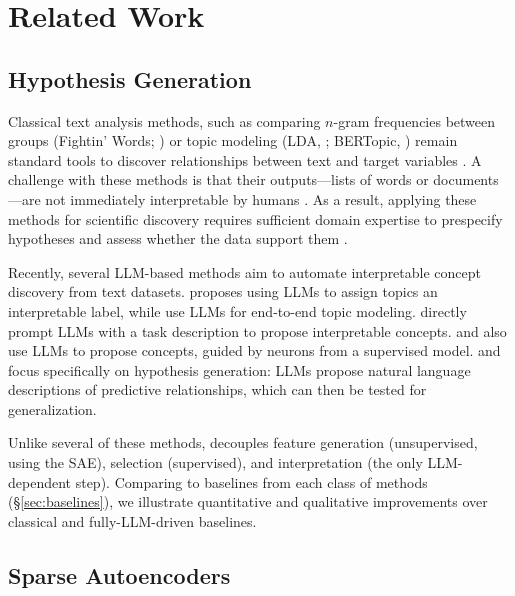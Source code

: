 \section{Related Work}
\label{sec:relatedwork}

\subsection{Hypothesis Generation}

Classical text analysis methods, such as comparing $n$-gram frequencies between groups (Fightin' Words; \citet{monroe_fightin_2009}) or topic modeling (LDA, \citet{blei_latent_2003}; BERTopic, \citet{grootendorst_bertopic_2022}) remain standard tools to discover relationships between text and target variables \citep{grimmer_text_2022}.
A challenge with these methods is that their outputs---lists of words or documents---are not immediately interpretable by humans \citep{chang_reading_2009}.
As a result, applying these methods for scientific discovery requires sufficient domain expertise to prespecify hypotheses and assess whether the data support them \citep{demszky_analyzing_2019, gentzkow_measuring_2016, sun_negative_2022}.

Recently, several LLM-based methods aim to automate interpretable concept discovery from text datasets. \citet{grootendorst_llm_2024} proposes using LLMs to assign topics an interpretable label, while \citet{pham_topicgpt_2024} use LLMs for end-to-end topic modeling.
\citet{ludan_interpretabledesign_2024} directly prompt LLMs with a task description to propose interpretable concepts. 
\citet{sun_concept_2024} and \citet{zhong_explaining_2024} also use LLMs to propose concepts, guided by neurons from a supervised model.
\citet{zhou_hypothesis_2024} and \citet{batista_words_2024} focus specifically on hypothesis generation: LLMs propose natural language descriptions of predictive relationships, which can then be tested for generalization.


Unlike several of these methods, \ourmethod decouples feature generation (unsupervised, using the SAE), selection (supervised), and interpretation (the only LLM-dependent step). 
Comparing to baselines from each class of methods (\S\ref{sec:baselines}), we illustrate quantitative and qualitative improvements over classical and fully-LLM-driven baselines.


\subsection{Sparse Autoencoders}

